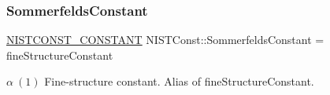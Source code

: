 \subsubsection{\texorpdfstring{Sommerfelds\+Constant}{SommerfeldsConstant}}
{\footnotesize\ttfamily \mbox{\hyperlink{group___n_i_s_t_const-_macros_ga2b0fc1d7452373f816175dd86ce26729}{N\+I\+S\+T\+C\+O\+N\+S\+T\+\_\+\+C\+O\+N\+S\+T\+A\+NT}} N\+I\+S\+T\+Const\+::\+Sommerfelds\+Constant = fine\+Structure\+Constant}

$\alpha \ (1)$ Fine-\/structure constant. Alias of fine\+Structure\+Constant. 